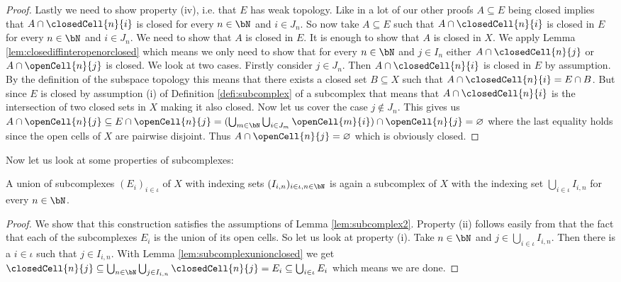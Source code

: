 \begin{proof}
    Lastly we need to show property (iv), i.e. that $E$ has weak topology. 
    Like in a lot of our other proofs $A \subseteq E$ being closed implies that $A \cap \closedCell{n}{i}$ is closed for every $n \in \bN$ and $i \in J_n$. 
    So now take $A \subseteq E$ such that $A \cap \closedCell{n}{i}$ is closed in $E$ for every $n \in \bN$ and $i \in J_n$. 
    We need to show that $A$ is closed in $E$.
    It is enough to show that $A$ is closed in $X$. 
    We apply Lemma \ref{lem:closediffinteropenorclosed} which means we only need to show that for every $n \in \bN$ and $j \in I_n$ either $A \cap \closedCell{n}{j}$ or $A \cap \openCell{n}{j}$ is closed. 
    We look at two cases. 
    Firstly consider $j \in J_n$. 
    Then $A \cap \closedCell{n}{i}$ is closed in $E$ by assumption.
    By the definition of the subspace topology this means that there exists a closed set $B \subseteq X$ such that $A \cap \closedCell{n}{i} = E \cap B$. 
    But since $E$ is closed by assumption (i) of Definition \ref{defi:subcomplex} of a subcomplex that means that $A \cap \closedCell{n}{i}$ is the intersection of two closed sets in $X$ making it also closed. 
    Now let us cover the case $j \notin J_n$. 
    This gives us $A \cap \openCell{n}{j} \subseteq E \cap \openCell{n}{j} = (\bigcup_{m \in \bN} \bigcup_{i \in J_m} \openCell{m}{i}) \cap \openCell{n}{j} = \varnothing$ where the last equality holds since the open cells of $X$ are pairwise disjoint. 
    Thus $A \cap \openCell{n}{j} = \varnothing$ which is obviously closed.
\end{proof}

Now let us look at some properties of subcomplexes: 

\begin{lem} \label{lem:unionsubcomplexes}
    A union of subcomplexes $(E_i)_{i \in \iota}$ of $X$  with indexing sets $(I_{i, n})_{i \in \iota, n \in \bN}$ is again a subcomplex of $X$ with the indexing set $\bigcup_{i \in \iota} I_{i, n}$ for every $n \in \bN$.
    \href{https://github.com/scholzhannah/CWComplexes/blob/7be4872a05b534011cc969eb5b80a4b7f0bf57e2/CWcomplexes/subcomplex.lean#L190-L209}{\faExternalLink}
\end{lem}
\begin{proof}
    We show that this construction satisfies the assumptions of Lemma \ref{lem:subcomplex2}. 
    Property (ii) follows easily from that the fact that each of the subcomplexes $E_i$ is the union of its open cells. 
    So let us look at property (i).
    Take $n \in \bN$ and $j \in \bigcup_{i \in \iota} I_{i, n}$. 
    Then there is a $i \in \iota$ such that $j \in I_{i, n}$. 
    With Lemma \ref{lem:subcomplexunionclosed} we get 
    $\closedCell{n}{j} \subseteq \bigcup_{n \in \bN}\bigcup_{j \in I_{i, n}} \closedCell{n}{j} = E_i \subseteq \bigcup_{i \in \iota} E_i$ which means we are done.
\end{proof}

